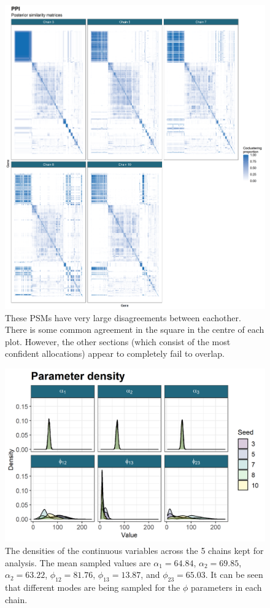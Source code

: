 \documentclass[]{article}
\begin{document}
\begin{figure}
	\centering
	\includegraphics[scale=0.5]{./Images/Yeast/PPIPSMcomparisonReduced.png}
	\caption{These PSMs have very large disagreements between eachother. There is some common agreement in the square in the centre of each plot. However, the other sections (which consist of the most confident allocations) appear to completely fail to overlap.}
	\label{fig:ppiPSMs}
\end{figure}

\begin{figure}
	\centering
	\includegraphics[scale=1]{./Images/Yeast/densityPlotReduced.png}
	\caption{The densities of the continuous variables across the 5 chains kept for analysis. The mean sampled values are $\alpha_1= 64.84$, $\alpha_2 = 69.85$, $\alpha_2 = 63.22$, $\phi_{12} = 81.76$, $\phi_{13} = 13.87$, and $\phi_{23} = 65.03$. It can be seen that different modes are being sampled for the $\phi$ parameters in each chain.
	}
	\label{fig:bayesDensities}
\end{figure}
\end{document}
